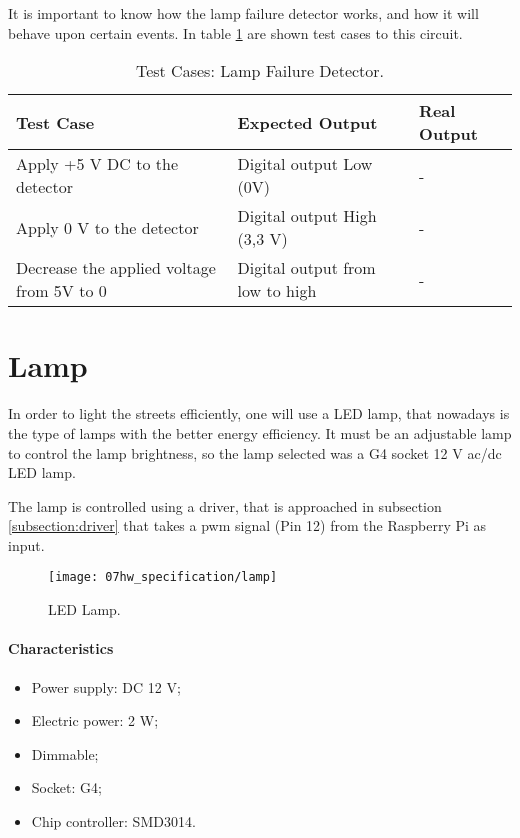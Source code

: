 It is important to know how the lamp failure detector works, and how it will behave upon certain events. In table \ref{table:test_lampfail} are shown test cases to this circuit.

\begin{table}[H]
	\centering
	\resizebox{\columnwidth}{!}
	{
		\begin{tabular}{|m{3cm}|m{5cm}||m{5cm}|}
			\hline
			\textbf{Test Case} & \textbf{Expected Output} & \textbf{Real Output}
			\\\hline\hline
			Apply +5 V DC to the detector & Digital output Low (0V) & - 
			\\\hline
			
			Apply 0 V to the detector & Digital output High (3,3 V) & - 
			\\\hline
				
			Decrease the applied voltage from 5V to 0 & Digital output from low to high & - 
			\\\hline			
		\end{tabular}
	}
	\caption{Test Cases: Lamp Failure Detector.}
	\label{table:test_lampfail}
\end{table}

\section{Lamp}

In order to light the streets efficiently, one will use a LED lamp, that nowadays is the type of lamps with the better energy efficiency. It must be an adjustable lamp to control the lamp brightness, so the lamp selected was a G4 socket 12 V \ac{ac}/\ac{dc} LED lamp.

The lamp is controlled using a driver, that is approached in subsection \ref{subsection:driver} that takes a \ac{pwm} signal (Pin 12) from the Raspberry Pi as input. 

\begin{figure}[H]
	\centering
	\texttt{[image: 07hw\_specification/lamp]}
	\caption{LED Lamp.}
	\label{fig:lamp}
\end{figure}

\paragraph*{Characteristics}
\begin{itemize}
	\item Power supply: DC 12 V;
	\item Electric power: 2 W;
	\item Dimmable;
	\item Socket: G4;   
	\item Chip controller: SMD3014.
\end{itemize}

